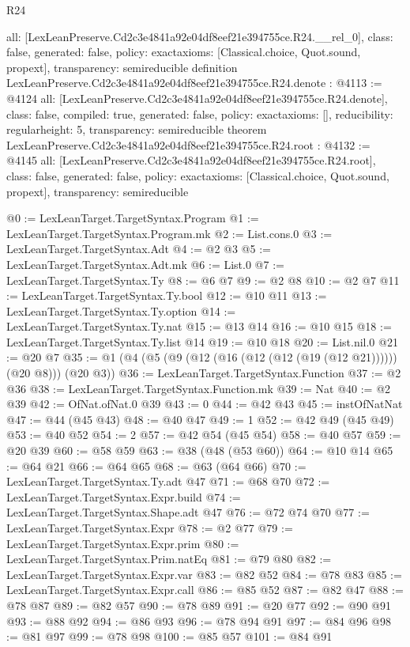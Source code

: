 \begin{lexlean}{R24}
\begin{coremodule}
{  all: [LexLeanPreserve.Cd2c3e4841a92e04df8eef21e394755ce.R24.__rel_0],
  class: false,
  generated: false,
  policy: exact{axioms: [Classical.choice, Quot.sound, propext]},
  transparency: semireducible
}
definition LexLeanPreserve.Cd2c3e4841a92e04df8eef21e394755ce.R24.denote : @4113 := @4124 {
  all: [LexLeanPreserve.Cd2c3e4841a92e04df8eef21e394755ce.R24.denote],
  class: false,
  compiled: true,
  generated: false,
  policy: exact{axioms: []},
  reducibility: regular{height: 5},
  transparency: semireducible
}
theorem LexLeanPreserve.Cd2c3e4841a92e04df8eef21e394755ce.R24.root : @4132 := @4145 {
  all: [LexLeanPreserve.Cd2c3e4841a92e04df8eef21e394755ce.R24.root],
  class: false,
  generated: false,
  policy: exact{axioms: [Classical.choice, Quot.sound, propext]},
  transparency: semireducible
}

@0 := LexLeanTarget.TargetSyntax.Program
@1 := LexLeanTarget.TargetSyntax.Program.mk
@2 := List.cons.{0}
@3 := LexLeanTarget.TargetSyntax.Adt
@4 := @2 @3
@5 := LexLeanTarget.TargetSyntax.Adt.mk
@6 := List.{0}
@7 := LexLeanTarget.TargetSyntax.Ty
@8 := @6 @7
@9 := @2 @8
@10 := @2 @7
@11 := LexLeanTarget.TargetSyntax.Ty.bool
@12 := @10 @11
@13 := LexLeanTarget.TargetSyntax.Ty.option
@14 := LexLeanTarget.TargetSyntax.Ty.nat
@15 := @13 @14
@16 := @10 @15
@18 := LexLeanTarget.TargetSyntax.Ty.list @14
@19 := @10 @18
@20 := List.nil.{0}
@21 := @20 @7
@35 := @1 (@4 (@5 (@9 (@12 (@16 (@12 (@12 (@19 (@12 @21)))))) (@20 @8))) (@20 @3))
@36 := LexLeanTarget.TargetSyntax.Function
@37 := @2 @36
@38 := LexLeanTarget.TargetSyntax.Function.mk
@39 := Nat
@40 := @2 @39
@42 := OfNat.ofNat.{0} @39
@43 := 0
@44 := @42 @43
@45 := instOfNatNat
@47 := @44 (@45 @43)
@48 := @40 @47
@49 := 1
@52 := @42 @49 (@45 @49)
@53 := @40 @52
@54 := 2
@57 := @42 @54 (@45 @54)
@58 := @40 @57
@59 := @20 @39
@60 := @58 @59
@63 := @38 (@48 (@53 @60))
@64 := @10 @14
@65 := @64 @21
@66 := @64 @65
@68 := @63 (@64 @66)
@70 := LexLeanTarget.TargetSyntax.Ty.adt @47
@71 := @68 @70
@72 := LexLeanTarget.TargetSyntax.Expr.build
@74 := LexLeanTarget.TargetSyntax.Shape.adt @47
@76 := @72 @74 @70
@77 := LexLeanTarget.TargetSyntax.Expr
@78 := @2 @77
@79 := LexLeanTarget.TargetSyntax.Expr.prim
@80 := LexLeanTarget.TargetSyntax.Prim.natEq
@81 := @79 @80
@82 := LexLeanTarget.TargetSyntax.Expr.var
@83 := @82 @52
@84 := @78 @83
@85 := LexLeanTarget.TargetSyntax.Expr.call
@86 := @85 @52
@87 := @82 @47
@88 := @78 @87
@89 := @82 @57
@90 := @78 @89
@91 := @20 @77
@92 := @90 @91
@93 := @88 @92
@94 := @86 @93
@96 := @78 @94 @91
@97 := @84 @96
@98 := @81 @97
@99 := @78 @98
@100 := @85 @57
@101 := @84 @91

\end{coremodule}
\end{lexlean}
